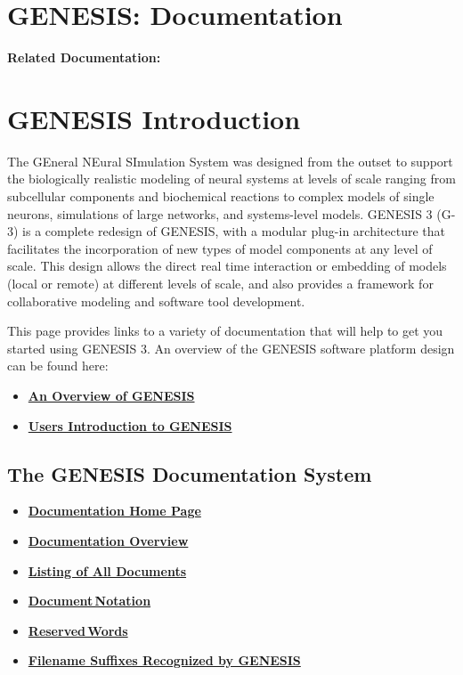 \documentclass[12pt]{article}
\begin{document}
\section*{GENESIS: Documentation}

{\bf Related Documentation:}

\section*{GENESIS Introduction}

The GEneral NEural SImulation System was designed from the outset
to support the biologically realistic modeling of neural systems at levels
of scale ranging from subcellular components and biochemical reactions to
complex models of single neurons, simulations of large networks, and
systems-level models.  GENESIS 3 (G-3) is a complete redesign of GENESIS,
with a modular plug-in architecture that facilitates the incorporation of
new types of model components at any level of scale.  This design allows
the direct real time interaction or embedding of models (local or remote)
at different levels of scale, and also provides a framework for
collaborative modeling and software tool development.

This page provides links to a variety of documentation that will help to get you started
using GENESIS 3. An overview of the GENESIS software platform design can be found here:

\begin{itemize}
\item \href{../genesis-overview/genesis-overview.tex}{\bf An Overview of GENESIS}
\item \href{../user-info/user-info.tex}{\bf Users Introduction to GENESIS}
\end{itemize}


\subsection*{The GENESIS Documentation System}
\begin{itemize}
\item \href{../documentation-homepage/documentation-homepage.tex}{\bf Documentation Home Page}
\item \href{../documentation-overview/documentation-overview.tex}{\bf Documentation Overview}
\item \href{../index.html}{\bf Listing of All Documents}
\item \href{../document-notation/document-notation.tex}{\bf Document\,Notation}
\item \href{../reserved-words/reserved-words.tex}{\bf Reserved\,Words}
\item \href{../common-suffixes/common-suffixes.tex}{\bf Filename Suffixes Recognized by GENESIS} 
\end{itemize}
\end{document}

